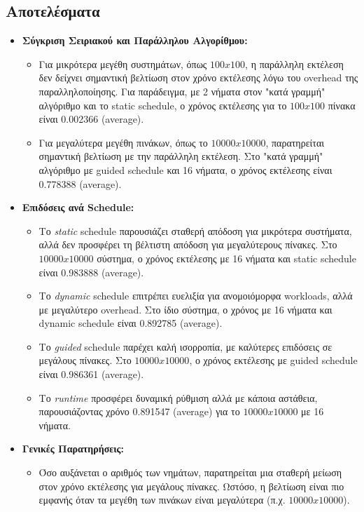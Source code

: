 \documentclass{article}
\begin{document}
\subsection*{Αποτελέσματα} 
\begin{itemize} 
    \item \textbf{Σύγκριση Σειριακού και Παράλληλου Αλγορίθμου:} 
    \begin{itemize} 
        \item Για μικρότερα μεγέθη συστημάτων, όπως $100x100$, η παράλληλη εκτέλεση δεν δείχνει σημαντική βελτίωση στον χρόνο εκτέλεσης λόγω του overhead της παραλληλοποίησης. Για παράδειγμα, με 2 νήματα στον "κατά γραμμή" αλγόριθμο και το static schedule, ο χρόνος εκτέλεσης για το $100x100$ πίνακα είναι 0.002366 (average).
        \item Για μεγαλύτερα μεγέθη πινάκων, όπως το $10000x10000$, παρατηρείται σημαντική βελτίωση με την παράλληλη εκτέλεση. Στο "κατά γραμμή" αλγόριθμο με guided schedule και 16 νήματα, ο χρόνος εκτέλεσης είναι 0.778388 (average).
    \end{itemize} 
    \item \textbf{Επιδόσεις ανά Schedule:} 
    \begin{itemize} 
        \item Το \textit{static} schedule παρουσιάζει σταθερή απόδοση για μικρότερα συστήματα, αλλά δεν προσφέρει τη βέλτιστη απόδοση για μεγαλύτερους πίνακες. Στο $10000x10000$ σύστημα, ο χρόνος εκτέλεσης με 16 νήματα και static schedule είναι 0.983888 (average).
        \item Το \textit{dynamic} schedule επιτρέπει ευελιξία για ανομοιόμορφα workloads, αλλά με μεγαλύτερο overhead. Στο ίδιο σύστημα, ο χρόνος με 16 νήματα και dynamic schedule είναι 0.892785 (average).
        \item Το \textit{guided} schedule παρέχει καλή ισορροπία, με καλύτερες επιδόσεις σε μεγάλους πίνακες. Στο $10000x10000$, ο χρόνος εκτέλεσης με guided schedule είναι 0.986361 (average).
        \item Το \textit{runtime} προσφέρει δυναμική ρύθμιση αλλά με κάποια αστάθεια, παρουσιάζοντας χρόνο 0.891547 (average) για το $10000x10000$ με 16 νήματα.
    \end{itemize} 
    \item \textbf{Γενικές Παρατηρήσεις:} 
    \begin{itemize} 
        \item Όσο αυξάνεται ο αριθμός των νημάτων, παρατηρείται μια σταθερή μείωση στον χρόνο εκτέλεσης για μεγάλους πίνακες. Ωστόσο, η βελτίωση είναι πιο εμφανής όταν τα μεγέθη των πινάκων είναι μεγαλύτερα (π.χ. $10000x10000$).
    \end{itemize} 
\end{itemize}
\end{document}
